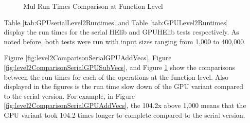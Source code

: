\begin{figure}[p]
\centering
{}

\caption{Mul Run Times Comparison at Function Level}
\label{fig:level2ComparisonSerialGPUMulVecs}
\end{figure}

Table \ref{tab:GPUserialLevel2Runtimes} and Table \ref{tab:GPULevel2Runtimes} display the run times for the serial HElib and GPUHElib tests respectively. As noted before, both tests were run with input sizes ranging from 1,000 to 400,000.

Figure \ref{fig:level2ComparisonSerialGPUAddVecs}, Figure \ref{fig:level2ComparisonSerialGPUSubVecs}, and Figure \ref{fig:level2ComparisonSerialGPUMulVecs} show the comparisons between the run times for each of the operations at the function level. Also displayed in the figures is the run time slow down of the GPU variant compared to the serial version. For example, in Figure \ref{fig:level2ComparisonSerialGPUAddVecs}, the 104.2x above 1,000 means that the GPU variant took 104.2 times longer to complete compared to the serial version.

